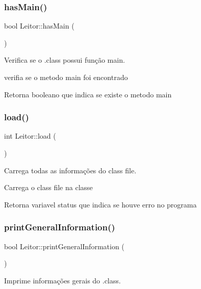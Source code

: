\subsubsection{\texorpdfstring{has\+Main()}{hasMain()}}
{\footnotesize\ttfamily bool Leitor\+::has\+Main (\begin{DoxyParamCaption}{ }\end{DoxyParamCaption})}



Verifica se o .class possui função main. 

verifia se o metodo main foi encontrado \begin{DoxyReturn}{Retorna}
booleano que indica se existe o metodo main 
\end{DoxyReturn}
\mbox{\label{classLeitor_a69b1505dbce4cfdbb9fcb7e70ca639e6}} 
\subsubsection{\texorpdfstring{load()}{load()}}
{\footnotesize\ttfamily int Leitor\+::load (\begin{DoxyParamCaption}{ }\end{DoxyParamCaption})}



Carrega todas as informações do class file. 

Carrega o class file na classe \begin{DoxyReturn}{Retorna}
variavel status que indica se houve erro no programa 
\end{DoxyReturn}
\mbox{\label{classLeitor_a61890be2d648f47fcc6817ac8c751660}} 
\subsubsection{\texorpdfstring{print\+General\+Information()}{printGeneralInformation()}}
{\footnotesize\ttfamily bool Leitor\+::print\+General\+Information (\begin{DoxyParamCaption}{ }\end{DoxyParamCaption})}



Imprime informações gerais do .class. 

